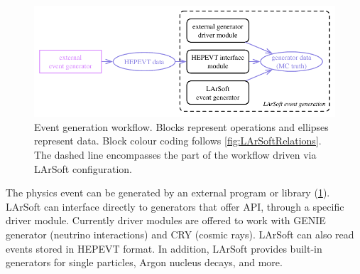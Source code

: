 \begin{figure}
   \centering
   \includegraphics{figures/LArSoftEventGeneration}
   \caption{\label{fig:LArSoftEventGeneration}
      Event generation workflow.
      Blocks represent operations and ellipses represent data.
      Block colour coding follows \cref{fig:LArSoftRelations}.
      The dashed line encompasses the part of the workflow driven via LArSoft configuration.
   }
\end{figure}
The physics event can be generated by an external program or library (\cref{fig:LArSoftEventGeneration}).
LArSoft can interface directly to generators that offer API, through a specific driver module.
Currently driver modules are offered to work
with GENIE generator (neutrino interactions) and CRY (cosmic rays).
LArSoft can also read events stored in HEPEVT format.
In addition, LArSoft provides built-in generators for single particles,
Argon nucleus decays, and more.

